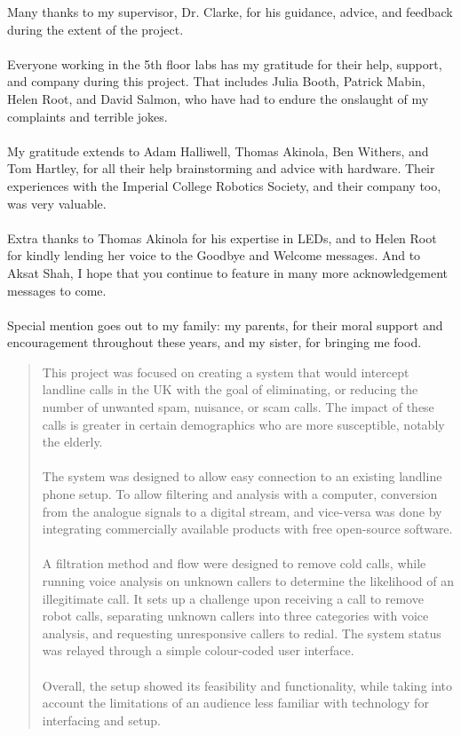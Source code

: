 \documentclass[12pt,a4paper]{report}
\begin{document}
\begin{acknowledgments}
 	\large M\normalsize any thanks to my supervisor, Dr. Clarke, for his guidance, advice, and feedback during the extent of the project.
	\\\\
	\large E\normalsize veryone working in the 5th floor labs has my gratitude for their help, support, and company during this project. That includes Julia Booth, Patrick Mabin, Helen Root, and David Salmon, who have had to endure the onslaught of my complaints and terrible jokes.
	\\\\
	\large M\normalsize y gratitude extends to Adam Halliwell, Thomas Akinola, Ben Withers, and Tom Hartley, for all their help brainstorming and advice with hardware. Their experiences with the Imperial College Robotics Society, and their company too, was very valuable.
	\\\\
	\large E\normalsize xtra thanks to Thomas Akinola for his expertise in LEDs, and to Helen Root for kindly lending her voice to the Goodbye and Welcome messages. And to Aksat Shah, I hope that you continue to feature in many more acknowledgement messages to come.
	\\\\
	\large S\normalsize pecial mention goes out to my family: my parents, for their moral support and encouragement throughout these years, and my sister, for bringing me food.
\end{acknowledgments}

\begin{abstract}
This project was focused on creating a system that would intercept landline calls in the UK with the goal of eliminating, or reducing the number of unwanted spam, nuisance, or scam calls. The impact of these calls is greater in certain demographics who are more susceptible, notably the elderly.
\\\\
The system was designed to allow easy connection to an existing landline phone setup. To allow filtering and analysis with a computer, conversion from the analogue signals to a digital stream, and vice-versa was done by integrating commercially available products with free open-source software.
\\\\
A filtration method and flow were designed to remove cold calls, while running voice analysis on unknown callers to determine the likelihood of an illegitimate call. It sets up a challenge upon receiving a call to remove robot calls, separating unknown callers into three categories with voice analysis, and requesting unresponsive callers to redial. The system status was relayed through a simple colour-coded user interface.
\\\\
Overall, the setup showed its feasibility and functionality, while taking into account the limitations of an audience less familiar with technology for interfacing and setup. 
\end{abstract}
\end{document}
